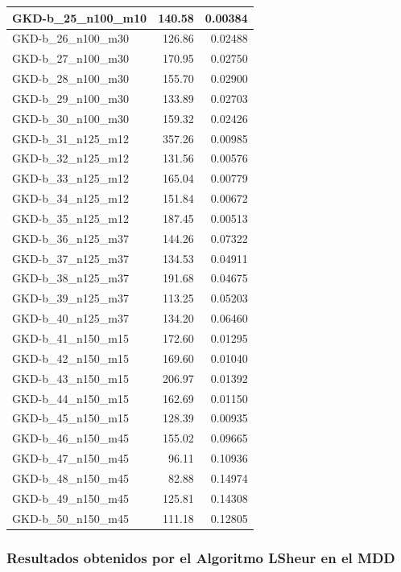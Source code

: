 \documentclass{article}
\begin{document}
\begin{table}[ht]
\begin{tabular}{|l|r|r|}
GKD-b\_25\_n100\_m10 & 140.58 & 0.00384 \\ \hline
GKD-b\_26\_n100\_m30 & 126.86 & 0.02488 \\ \hline
GKD-b\_27\_n100\_m30 & 170.95 & 0.02750 \\ \hline
GKD-b\_28\_n100\_m30 & 155.70 & 0.02900 \\ \hline
GKD-b\_29\_n100\_m30 & 133.89 & 0.02703 \\ \hline
GKD-b\_30\_n100\_m30 & 159.32 & 0.02426 \\ \hline
GKD-b\_31\_n125\_m12 & 357.26 & 0.00985 \\ \hline
GKD-b\_32\_n125\_m12 & 131.56 & 0.00576 \\ \hline
GKD-b\_33\_n125\_m12 & 165.04 & 0.00779 \\ \hline
GKD-b\_34\_n125\_m12 & 151.84 & 0.00672 \\ \hline
GKD-b\_35\_n125\_m12 & 187.45 & 0.00513 \\ \hline
GKD-b\_36\_n125\_m37 & 144.26 & 0.07322 \\ \hline
GKD-b\_37\_n125\_m37 & 134.53 & 0.04911 \\ \hline
GKD-b\_38\_n125\_m37 & 191.68 & 0.04675 \\ \hline
GKD-b\_39\_n125\_m37 & 113.25 & 0.05203 \\ \hline
GKD-b\_40\_n125\_m37 & 134.20 & 0.06460 \\ \hline
GKD-b\_41\_n150\_m15 & 172.60 & 0.01295 \\ \hline
GKD-b\_42\_n150\_m15 & 169.60 & 0.01040 \\ \hline
GKD-b\_43\_n150\_m15 & 206.97 & 0.01392 \\ \hline
GKD-b\_44\_n150\_m15 & 162.69 & 0.01150 \\ \hline
GKD-b\_45\_n150\_m15 & 128.39 & 0.00935 \\ \hline
GKD-b\_46\_n150\_m45 & 155.02 & 0.09665 \\ \hline
GKD-b\_47\_n150\_m45 & 96.11 & 0.10936 \\ \hline
GKD-b\_48\_n150\_m45 & 82.88 & 0.14974 \\ \hline
GKD-b\_49\_n150\_m45 & 125.81 & 0.14308 \\ \hline
GKD-b\_50\_n150\_m45 & 111.18 & 0.12805 \\ \hline
\end{tabular}
\end{table}

\newpage
\subsubsection{Resultados obtenidos por el Algoritmo LSheur en el MDD}
\end{document}
